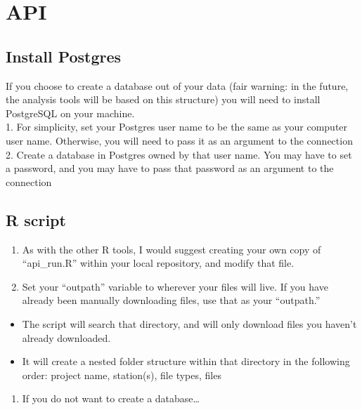 \documentclass[
]{book}
\providecommand{\tightlist}{%
  \setlength{\itemsep}{0pt}\setlength{\parskip}{0pt}}
\begin{document}
\hypertarget{intro}{%
\chapter{API}\label{intro}}

\hypertarget{install-postgres}{%
\section{Install Postgres}\label{install-postgres}}

If you choose to create a database out of your data (fair warning: in the future, the analysis tools will be based on this structure) you will need to install PostgreSQL on your machine.\\
1. For simplicity, set your Postgres user name to be the same as your computer user name. Otherwise, you will need to pass it as an argument to the connection\\
2. Create a database in Postgres owned by that user name. You may have to set a password, and you may have to pass that password as an argument to the connection

\hypertarget{r-script}{%
\section{R script}\label{r-script}}

\begin{enumerate}
\def\labelenumi{\arabic{enumi}.}
\tightlist
\item
  As with the other R tools, I would suggest creating your own copy of ``api\_run.R'' within your local repository, and modify that file.
\item
  Set your ``outpath'' variable to wherever your files will live. If you have already been manually downloading files, use that as your ``outpath.''
\end{enumerate}

\begin{itemize}
\tightlist
\item
  The script will search that directory, and will only download files you haven't already downloaded.
\item
  It will create a nested folder structure within that directory in the following order: project name, station(s), file types, files
\end{itemize}

\begin{enumerate}
\def\labelenumi{\arabic{enumi}.}
\setcounter{enumi}{2}
\tightlist
\item
  If you do not want to create a database\ldots{}
\end{enumerate}
\end{document}
